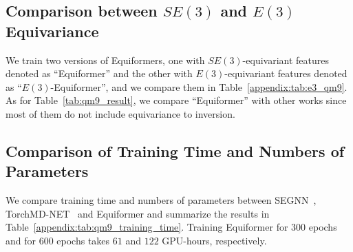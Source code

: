\subsection{Comparison between $SE(3)$ and $E(3)$ Equivariance}
\label{appendix:subsec:e3_qm9}
We train two versions of Equiformers, one with $SE(3)$-equivariant features denoted as ``Equiformer'' and the other with $E(3)$-equivariant features denoted as ``$E(3)$-Equiformer'', and we compare them in Table~\ref{appendix:tab:e3_qm9}.
As for Table~\ref{tab:qm9_result}, we compare ``Equiformer'' with other works since most of them do not include equivariance to inversion.

\begin{table}[th]
\centering
{}
\vspace{-2mm}
\caption{\textbf{Ablation study of $SE(3)$/$E(3)$ equivariance on QM9 testing set.}  
``Equiformer'' operates on $SE(3)$-equivariant features while ``$E(3)$-Equiformer'' uses $E(3)$-equivariant features.
Including inversion achieves similar performance.
}
\vspace{-2.5mm}
\label{appendix:tab:e3_qm9}
\end{table}


\subsection{Comparison of Training Time and Numbers of Parameters}
\label{appendix:subsec:qm9_training_time_comparison}
We compare training time and numbers of parameters between SEGNN~\citep{segnn}, TorchMD-NET~\citep{torchmd_net} and Equiformer and summarize the results in Table~\ref{appendix:tab:qm9_training_time}.
Training Equiformer for $300$ epochs and for $600$ epochs takes $61$ and $122$ GPU-hours, respectively.

